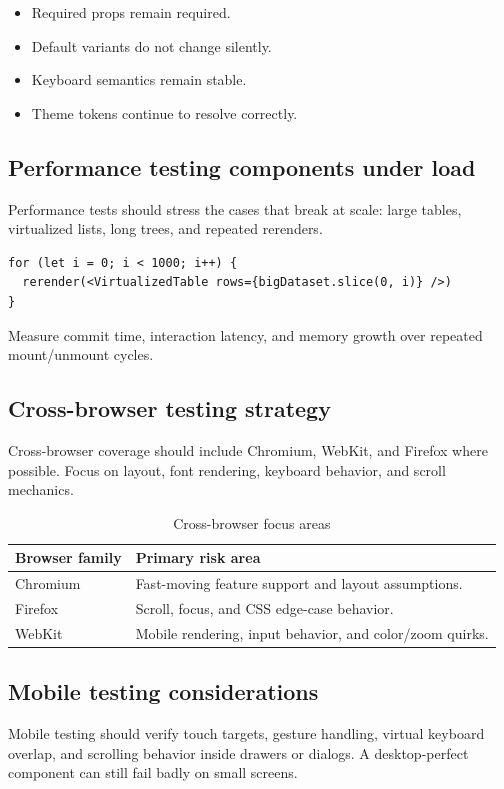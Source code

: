\begin{itemize}[leftmargin=*, itemsep=0.35em]
  \item Required props remain required.
  \item Default variants do not change silently.
  \item Keyboard semantics remain stable.
  \item Theme tokens continue to resolve correctly.
\end{itemize}

\subsection{Performance testing components under load}
Performance tests should stress the cases that break at scale: large tables, virtualized lists, long trees, and repeated rerenders.

\begin{verbatim}
for (let i = 0; i < 1000; i++) {
  rerender(<VirtualizedTable rows={bigDataset.slice(0, i)} />)
}
\end{verbatim}

Measure commit time, interaction latency, and memory growth over repeated mount/unmount cycles.

\subsection{Cross-browser testing strategy}
Cross-browser coverage should include Chromium, WebKit, and Firefox where possible. Focus on layout, font rendering, keyboard behavior, and scroll mechanics.

\begin{table}[htbp]
  \centering
  \caption{Cross-browser focus areas}
  \begin{tabularx}{\textwidth}{@{}p{}Y@{}}
    \toprule
    \textbf{Browser family} & \textbf{Primary risk area} \\
    \midrule
    Chromium & Fast-moving feature support and layout assumptions. \\
    Firefox & Scroll, focus, and CSS edge-case behavior. \\
    WebKit & Mobile rendering, input behavior, and color/zoom quirks. \\
    \bottomrule
  \end{tabularx}
\end{table}

\subsection{Mobile testing considerations}
Mobile testing should verify touch targets, gesture handling, virtual keyboard overlap, and scrolling behavior inside drawers or dialogs. A desktop-perfect component can still fail badly on small screens.

